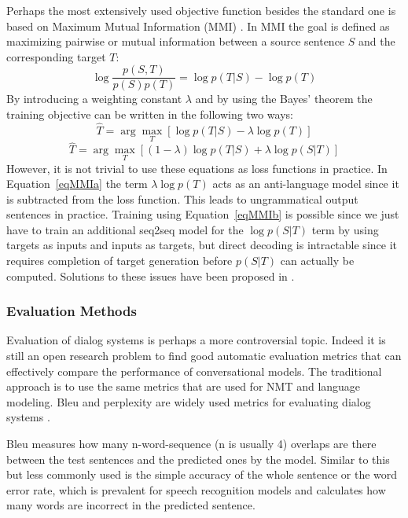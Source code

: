 \documentclass[12pt]{article}
\begin{document}
Perhaps the most extensively used objective function besides the standard one is based on Maximum Mutual Information (MMI) \cite{Li:2015}. In MMI the goal is defined as maximizing pairwise or mutual information between a source sentence \(S\) and the corresponding target \(T\):
\begin{equation}
\log{\frac{p(S,T)}{p(S)p(T)}}=\log{p(T|S)}-\log{p(T)}
\end{equation}
By introducing a weighting constant \(\lambda\) and by using the Bayes' theorem the training objective can be written in the following two ways:
\begin{equation} \label{eqMMIa}
\hat{T}=\arg\max_{T}[\log{p(T|S)}-\lambda\log{p(T)}]
\end{equation}
\begin{equation} \label{eqMMIb}
\hat{T}=\arg\max_{T}[(1-\lambda)\log{p(T|S)}+\lambda\log{p(S|T)}]
\end{equation}
However, it is not trivial to use these equations as loss functions in practice. In Equation~\ref{eqMMIa} the term \(\lambda\log{p(T)}\) acts as an anti-language model since it is subtracted from the loss function. This leads to ungrammatical output sentences in practice. Training using Equation~\ref{eqMMIb} is possible since we just have to train an additional seq2seq model for the \(\log{p(S|T)}\) term by using targets as inputs and inputs as targets, but direct decoding is intractable since it requires completion of target generation before \(p(S|T)\) can actually be computed. Solutions to these issues have been proposed in \cite{Li:2015}.

\subsubsection{Evaluation Methods} \label{sssec:eval}
Evaluation of dialog systems is perhaps a more controversial topic. Indeed it is still an open research problem to find good automatic evaluation metrics that can effectively compare the performance of conversational models. The traditional approach is to use the same metrics that are used for NMT and language modeling. Bleu and perplexity are widely used metrics for evaluating dialog systems \cite{Vinyals:2015,Yao:2016,Zhao:2017,Serban:2015}. 

Bleu \cite{Papineni:2002} measures how many n-word-sequence (n is usually 4) overlaps are there between the test sentences and the predicted ones by the model. Similar to this but less commonly used is the simple accuracy of the whole sentence or the word error rate, which is prevalent for speech recognition models \cite{Shannon:2017,Park:2008} and calculates how many words are incorrect in the predicted sentence.
\end{document}
